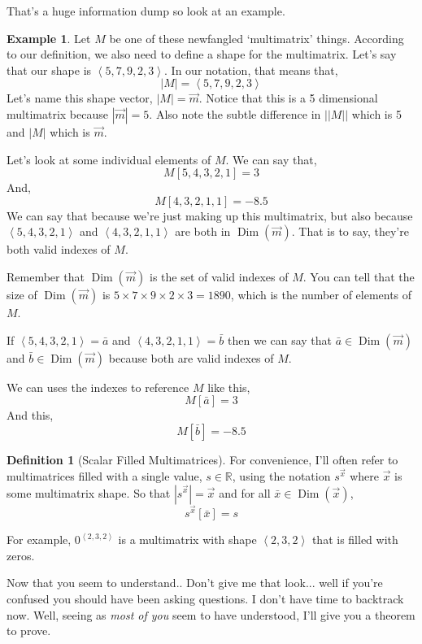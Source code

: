 \documentclass[12pt]{book}
\theoremstyle{plain}
\theoremstyle{definition}
\newtheorem{definition}{Definition}[chapter]
\newtheorem{example}{Example}[chapter]
\theoremstyle{ppart}
\theoremstyle{case}
\theoremstyle{solution}
\DeclareMathOperator{\Dim}{Dim}
\newcommand{\shape}[1]{\left|#1\right|}
\begin{document}
That's a huge information dump so look at an example.

\begin{example}
Let $M$ be one of these newfangled `multimatrix' things. According to our
definition, we also need to define a shape for the multimatrix. Let's
say that our shape is $\left<5,7,9,2,3\right>$. In our notation, that
means that,
\[ \shape{M} = \left<5,7,9,2,3\right> \]
Let's name this shape vector, $\shape{M} = \vec{m}$. Notice that this is
a 5 dimensional multimatrix because $\shape{\vec{m}} = 5$. Also note the
subtle difference in $\shape{\shape{M}}$ which is 5 and $\shape{M}$ which is $\vec{m}$.

Let's look at some individual elements of $M$. We can say that,
\[ M[5,4,3,2,1] = 3 \]
And,
\[ M[4,3,2,1,1] = -8.5 \]
We can say that because we're just making up this multimatrix, but also
because $\left<5,4,3,2,1\right>$ and $\left<4,3,2,1,1\right>$
are both in $\Dim(\vec{m})$. That is to say, they're both valid
indexes of $M$.

Remember that $\Dim(\vec{m})$ is the set of valid indexes of $M$.
You can tell that the size of  $\Dim(\vec{m})$ is
$5 \times 7 \times 9 \times 2 \times 3 = 1890$, which is the number of
elements of $M$.

If $\left<5,4,3,2,1\right> = \bar{a}$ and $\left<4,3,2,1,1\right> = \bar{b}$
then we can say that $\bar{a} \in \Dim(\vec{m})$ and $\bar{b} \in \Dim(\vec{m})$
because both are valid indexes of $M$.

We can uses the indexes to reference $M$ like this,
\[ M[\bar{a}] = 3 \]
And this,
\[ M[\bar{b}] = -8.5 \]
\end{example}

\begin{definition}[Scalar Filled Multimatrices]
For convenience, I'll often refer to multimatrices filled with a single value,
$s \in \mathbb{R}$,
using the notation $s^{\vec{x}}$ where $\vec{x}$ is some multimatrix shape. So that
$\shape{s^{\vec{x}}} = \vec{x}$ and for all $\bar{x} \in \Dim(\vec{x})$,
\[ s^{\vec{x}}[\bar{x}] = s \]

For example, $0^{\left<2,3,2\right>}$ is a multimatrix with shape $\left<2,3,2\right>$
that is filled with zeros.
\end{definition}

Now that you seem to understand.. Don't give me that look... well if you're confused
you should have been asking questions. I don't have time to backtrack now.
Well, seeing as \textit{most of you} seem to have understood, I'll give you a theorem to prove.
\end{document}
